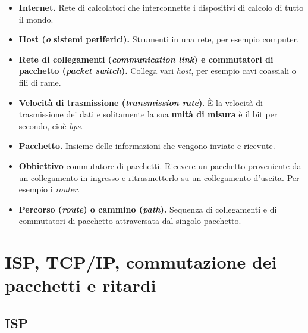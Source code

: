 \documentclass[a4paper]{article}
\begin{document}
	\begin{itemize}
		\item[\ding{42}] \textcolor{Red3}{\textbf{Internet.}} Rete di calcolatori che interconnette i dispositivi di calcolo di tutto il mondo.
		
		\item[\ding{42}] \textcolor{Red3}{\textbf{Host (\emph{o} sistemi periferici).}} Strumenti in una rete, per esempio computer.
		
		\item[\ding{42}] \textcolor{Red3}{\textbf{Rete di collegamenti (\emph{communication link}) e commutatori di pacchetto (\emph{packet switch}).}} Collega vari \emph{host}, per esempio cavi coassiali o fili di rame.
		
		\item[\ding{42}] \textcolor{Red3}{\textbf{Velocità di trasmissione (\emph{transmission rate})}}. È la velocità di trasmissione dei dati e solitamente la sua \textbf{unità di misura} è il bit per secondo, cioè \emph{bps}.
		
		\item[\ding{42}] \textcolor{Red3}{\textbf{Pacchetto.}} Insieme delle informazioni che vengono inviate e ricevute.
		
		\item[\ding{42}] \textcolor{Red3}{\textbf{\underline{Obbiettivo}} commutatore di pacchetti.} Ricevere un pacchetto proveniente da un collegamento in ingresso e ritrasmetterlo su un collegamento d'uscita. Per esempio i \emph{router}.
		
		\item[\ding{42}] \textcolor{Red3}{\textbf{Percorso (\emph{route}) o cammino (\emph{path}).}} Sequenza di collegamenti e di commutatori di pacchetto attraversata dal singolo pacchetto.
	\end{itemize}

	\newpage
	
	\section{ISP, TCP/IP, commutazione dei pacchetti e ritardi}
	
	\subsection{ISP}
	
\end{document}
